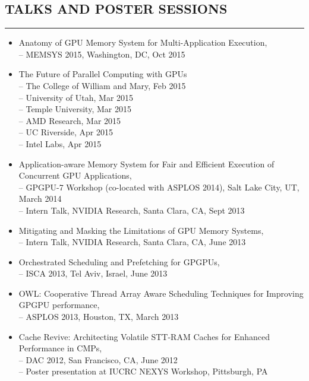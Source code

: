 \documentclass[10pt,a4]{article}
\begin{document}
\subsection*{TALKS AND POSTER SESSIONS}
\hrule
\vspace{0.2cm}
\begin{itemize}
\item Anatomy of GPU Memory System for Multi-Application Execution, \\
-- MEMSYS 2015, Washington, DC, Oct 2015 

\item The Future of Parallel Computing with GPUs \\
-- The College of William and Mary, Feb 2015 \\
-- University of Utah, Mar 2015 \\
-- Temple University, Mar 2015 \\
-- AMD Research, Mar 2015 \\
-- UC Riverside, Apr 2015 \\
-- Intel Labs, Apr 2015 

\item Application-aware Memory System for Fair and Efficient Execution of Concurrent GPU Applications, \\
-- GPGPU-7 Workshop (co-located with ASPLOS 2014), Salt Lake City, UT, March 2014 \\
-- Intern Talk, NVIDIA Research, Santa Clara, CA, Sept 2013

\item Mitigating and Masking the Limitations of GPU Memory Systems, \\
-- Intern Talk, NVIDIA Research, Santa Clara, CA, June 2013

\item Orchestrated Scheduling and Prefetching for GPGPUs, \\
-- ISCA 2013, Tel Aviv, Israel, June 2013

\item OWL: Cooperative Thread Array Aware Scheduling Techniques for Improving GPGPU performance, \\
-- ASPLOS 2013, Houston, TX, March 2013 

\item Cache Revive: Architecting Volatile STT-RAM Caches for Enhanced Performance in CMPs, \\
-- DAC 2012, San Francisco, CA, June 2012\\
-- Poster presentation at IUCRC NEXYS Workshop, Pittsburgh, PA
\end{itemize}
\end{document}
